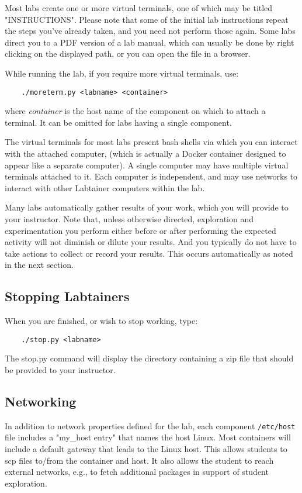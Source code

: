 \documentclass[12pt]{article}
\begin{document}
Most labs create one or more virtual terminals, one of which may be titled "INSTRUCTIONS".
Please note that some of the initial lab instructions repeat the steps you've already taken, and you need
not perform those again.  Some labs direct you to a PDF version of a lab manual, which can usually 
be done by right clicking on the displayed path, or you can open the file in a browser.

While running the lab, if you require more virtual terminals, use:
\begin{verbatim}
    ./moreterm.py <labname> <container>
\end{verbatim}
\noindent where \textit{container} is the host name of the component on which to attach a terminal.  
It can be omitted for labs having a single component.

The virtual terminals for most labs present bash shells via which you can interact
with the attached computer, (which is actually a Docker container designed to appear
like a separate computer).  A single computer
may have multiple virtual terminals attached to it.  Each computer is independent, and 
may use networks to interact with other Labtainer computers within the lab.  

Many labs automatically gather results of your work, which you will provide to your instructor.
Note that, unless otherwise directed, exploration and experimentation you perform either before
or after performing the expected activity will not diminish or dilute your results.  And you typically
do not have to take actions to collect or record your results.  This occurs automatically as noted in the 
next section.  

\subsection{Stopping Labtainers}
When you are finished, or wish to stop working, type:
\begin{verbatim}
    ./stop.py <labname>
\end{verbatim}
\noindent The stop.py command will display the directory containing a zip file that should be provided to your instructor.
\subsection{Networking}
In addition to network properties defined for the lab,
each component \texttt{/etc/host} file includes a "my\_host entry" that names
the host Linux.  Most containers will include a default gateway that
leads to the Linux host.  This allows students to scp files to/from the container and host.
It also allows the student to reach external networks, e.g., to fetch additional packages in
support of student exploration.
\end{document}
